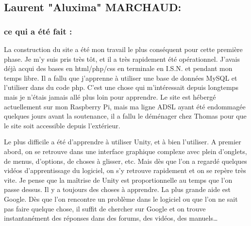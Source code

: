 \documentclass[a4paper]{article}
\begin{document}
\quad
\newpage

	\subsection{Laurent "Aluxima" MARCHAUD:}


\quad

		\subsubsection{ce qui a été fait :}

\quad

La construction du site a été mon travail le plus conséquent pour cette première phase. Je m’y suis pris très tôt, et il a très rapidement été opérationnel. J’avais déjà acqui des bases en html/php/css en terminale en I.S.N. et pendant mon temps libre. Il a fallu que j’apprenne à utiliser une base de données MySQL et l’utiliser dans du code php. C’est une chose qui m’intéressait depuis longtemps mais je n’étais jamais allé plus loin pour apprendre.
Le site est hébergé actuellement sur mon Raspberry Pi, mais ma ligne ADSL ayant été endommagée quelques jours avant la soutenance, il a fallu le déménager chez Thomas pour que le site soit accessible depuis l’extérieur.

    Le plus difficile a été d’apprendre à utiliser Unity, et à bien l’utiliser. A premier abord, on se retrouve dans une interface graphique complexe avec plein d’onglets, de menus, d’options, de choses à glisser, etc. Mais dès que l’on a regardé quelques vidéos d’apprentissage du logiciel, on s’y retrouve rapidement et on se repère très vite. Je pense que la maîtrise de Unity est proportionnelle au temps que l’on passe dessus. Il y a toujours des choses à apprendre. 
La plus grande aide est Google. Dès que l’on rencontre un problème dans le logiciel ou que l’on ne sait pas faire quelque chose, il suffit de chercher sur Google et on trouve instantanément des réponses dans des forums, des vidéos, des manuels…
\end{document}
